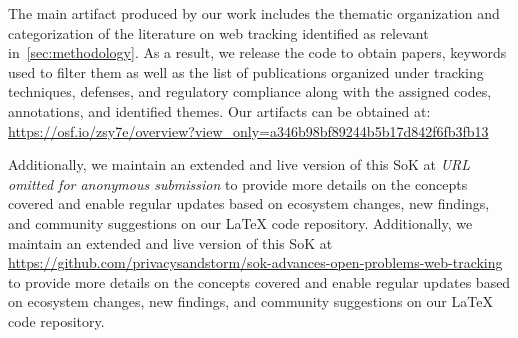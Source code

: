 \label{sec:open-science}

The main artifact produced by our work includes the thematic organization and categorization of the literature on web tracking identified as relevant in~\autoref{sec:methodology}.
%
As a result, we release the code to obtain papers, keywords used to filter them as well as the list of publications organized under tracking techniques, defenses, and regulatory compliance along with the assigned codes, annotations, and identified themes. Our artifacts can be obtained at: 
\url{https://osf.io/zsy7e/overview?view_only=a346b98bf89244b5b17d842f6fb3fb13}

\ifanonymous
Additionally, we maintain an extended and live version of this SoK at \textit{URL omitted for anonymous submission} to provide more details on the concepts covered and enable regular updates based on ecosystem changes, new findings, and community suggestions on our \LaTeX{} code repository.
\else
Additionally, we maintain an extended and live version of this SoK at \url{https://github.com/privacysandstorm/sok-advances-open-problems-web-tracking} to provide more details on the concepts covered and enable regular updates based on ecosystem changes, new findings, and community suggestions on our \LaTeX{} code repository.
\fi
%
